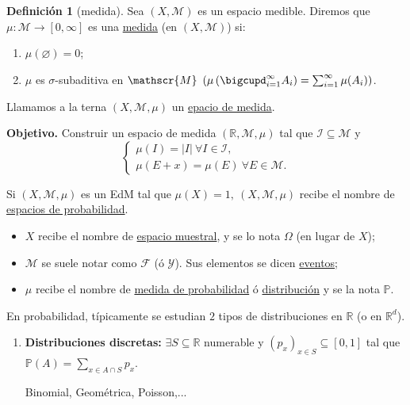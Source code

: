 \documentclass[11pt]{article}
\theoremstyle{definition} %
\newtheorem{definition}[theorem]{Definición}
\newcommand{\R}{\mathbb{R}}
\begin{document}
\begin{property}
\begin{definition}[medida]
	Sea $(X,\mathscr{M})$ es un espacio medible. Diremos que $\mu : \mathscr{M} \to [0,\infty]$ es una \underline{medida} (en $(X,\mathscr{M})$) si:
	\begin{enumerate}
		\item $\mu (\varnothing) = 0$;
		
		\item $\mu$ es $\sigma$-subaditiva en $\mathscr{M}\ \left( \mu \left(\bigcupd_{i=1}^{\infty} A_i \right) = \sum_{i=1}^{\infty} \mu(A_i) \right)$.
	\end{enumerate}
	\noindent Llamamos a la terna $(X,\mathscr{M},\mu)$ un \underline{epacio de medida}.
\end{definition}

\noindent \textbf{Objetivo.} Construir un espacio de medida $(\R,\mathscr{M},\mu)$ tal que $\mathcal{I} \subseteq \mathscr{M}$ y
\[ \begin{cases}
	\mu(I) = |I|\ \forall I \in \mathcal{I}, \\
	\mu(E+x) = \mu(E) \ \forall E \in \mathscr{M}.
\end{cases} \]

\begin{eg}
	Si $(X,\mathscr{M},\mu)$ es un EdM tal que $\mu(X)=1,\ (X,\mathscr{M},\mu)$ recibe el nombre de \underline{espacios de probabilidad}.
\end{eg}

\begin{itemize}
	\item $X$ recibe el nombre de \underline{espacio muestral}, y se lo nota $\Omega$ (en lugar de $X$);

	\item $\mathscr{M}$ se suele notar como $\mathscr{F}$ (ó $\mathscr{Y}$). Sus elementos se dicen \underline{eventos};

	\item $\mu$ recibe el nombre de \underline{medida de probabilidad} ó \underline{distribución} y se la nota $\mathbb{P}$.
\end{itemize}

\noindent En probabilidad, típicamente se estudian $2$ tipos de distribuciones en $\R$ (o en $\R^d$).

\begin{enumerate}
	\item \textbf{Distribuciones discretas:} $\exists S \subseteq \R$ numerable y $(p_x)_{x \in S} \subseteq [0,1]$ tal que $\mathbb{P}(A) = \sum_{x \in A \cap S} p_x$.
	\begin{eg}
		Binomial, Geométrica, Poisson,...
	\end{eg}


\end{enumerate}
\end{property}
\end{document}

